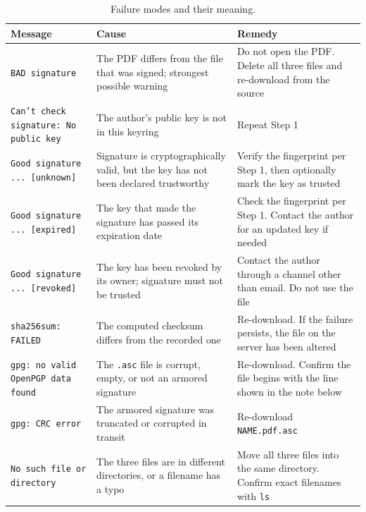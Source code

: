 \begin{table}[H]
	\centering
	\caption{Failure modes and their meaning.}
	\label{tab:troubleshooting}
	\footnotesize
	\begin{tabularx}{\textwidth}{>{\raggedright\arraybackslash}p{4.2cm} X X}
		\toprule
		Message                                       & Cause                                                                               & Remedy                                                                                 \\
		\midrule
		\texttt{BAD signature}                        & The PDF differs from the file that was signed; strongest possible warning           & Do not open the PDF. Delete all three files and re-download from the source            \\
		\texttt{Can't check signature: No public key} & The author's public key is not in this keyring                                      & Repeat Step 1                                                                          \\
		\texttt{Good signature ... [unknown]}         & Signature is cryptographically valid, but the key has not been declared trustworthy & Verify the fingerprint per Step 1, then optionally mark the key as trusted             \\
		\texttt{Good signature ... [expired]}         & The key that made the signature has passed its expiration date                      & Check the fingerprint per Step 1. Contact the author for an updated key if needed      \\
		\texttt{Good signature ... [revoked]}         & The key has been revoked by its owner; signature must not be trusted                & Contact the author through a channel other than email. Do not use the file             \\
		\texttt{sha256sum: FAILED}                    & The computed checksum differs from the recorded one                                 & Re-download. If the failure persists, the file on the server has been altered          \\
		\texttt{gpg: no valid OpenPGP data found}     & The \texttt{.asc} file is corrupt, empty, or not an armored signature               & Re-download. Confirm the file begins with the line shown in the note below             \\
		\texttt{gpg: CRC error}                       & The armored signature was truncated or corrupted in transit                         & Re-download \texttt{NAME.pdf.asc}                                                      \\
		\texttt{No such file or directory}            & The three files are in different directories, or a filename has a typo              & Move all three files into the same directory. Confirm exact filenames with \texttt{ls} \\
		\bottomrule
	\end{tabularx}
\end{table}

